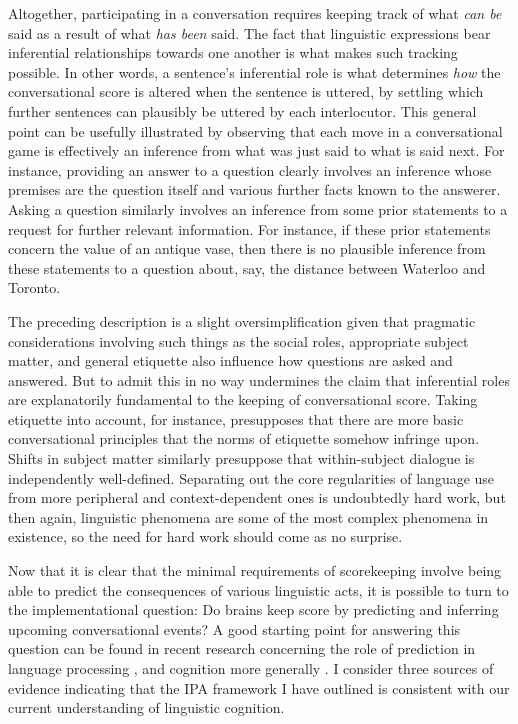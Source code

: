 Altogether, participating in a conversation requires keeping track of what \textit{can be} said as a result of what \textit{has been} said. The fact that linguistic expressions bear inferential relationships towards one another is what makes such tracking possible. In other words, a sentence's inferential role is what determines \textit{how} the conversational score is altered when the sentence is uttered, by settling which further sentences can plausibly be uttered by each interlocutor. This general point can be usefully illustrated by observing that each move in a conversational game is effectively an inference from what was just said to what is said next. For instance, providing an answer to a question clearly involves an inference whose premises are the question itself and various further facts known to the answerer. Asking a question similarly involves an inference from some prior statements to a request for further relevant information. For instance, if these prior statements concern the value of an antique vase, then there is no plausible inference from these statements to a question about, say, the distance between Waterloo and Toronto.  

The preceding description is a slight oversimplification given that pragmatic considerations involving such things as the social roles, appropriate subject matter, and general etiquette also influence how questions are asked and answered. But to admit this in no way undermines the claim that inferential roles are explanatorily fundamental to the keeping of conversational score. Taking etiquette into account, for instance, presupposes that there are more basic conversational principles that the norms of etiquette somehow infringe upon. Shifts in subject matter similarly presuppose that within-subject dialogue is independently well-defined. Separating out the core regularities of language use from more peripheral and context-dependent ones is undoubtedly hard work, but then again, linguistic phenomena are some of the most complex phenomena in existence, so the need for hard work should come as no surprise.

Now that it is clear that the minimal requirements of scorekeeping involve being able to predict the consequences of various linguistic acts, it is possible to turn to the implementational question: Do brains keep score by predicting and inferring upcoming conversational events? A good starting point for answering this question can be found in recent research concerning the role of prediction in language processing \citep{Pickering:2013,Pickering:2007,Christiansen:2015}, and cognition more generally \citep{clark:2013}. I consider three sources of evidence indicating that the IPA framework I have outlined is consistent with our current understanding of linguistic cognition.

